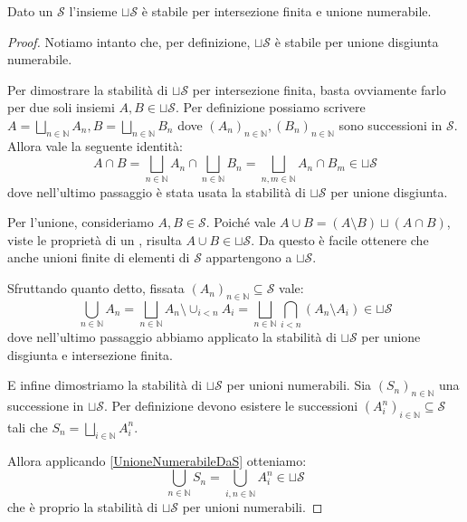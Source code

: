 \begin{proposition}\label{UnioneDisgiuntaQuasiAlgebra}
	Dato un \semiring{} $\mathcal S$ l'insieme $\sqcup\mathcal S$ è stabile per intersezione finita e unione numerabile.
\end{proposition}
\begin{proof}
	Notiamo intanto che, per definizione, $\sqcup\mathcal S$ è stabile per unione disgiunta numerabile.
	
	Per dimostrare la stabilità di $\sqcup\mathcal S$ per intersezione finita, basta ovviamente farlo per due soli insiemi $A,B\in\sqcup\mathcal S$. Per definizione possiamo scrivere $A=\bigsqcup_{n\in\mathbb N} A_n, B=\bigsqcup_{n\in\mathbb N} B_n$ dove $(A_n)_{n\in\mathbb N},(B_n)_{n\in\mathbb N}$ sono successioni in $\mathcal S$. Allora vale la seguente identità:
	\begin{equation*}
		A\cap B=\bigsqcup_{n\in\mathbb N} A_n\cap\bigsqcup_{n\in\mathbb N} B_n=
		\bigsqcup_{n,m\in\mathbb N} A_n\cap B_m\in\sqcup\mathcal S
	\end{equation*}
	dove nell'ultimo passaggio è stata usata la stabilità di $\sqcup\mathcal S$ per unione disgiunta.
	
	Per l'unione, consideriamo $A,B\in\mathcal S$. Poiché vale $A\cup B=(A\setminus B)\sqcup(A\cap B)$, viste le proprietà di un \semiring{}, risulta $A\cup B\in \sqcup\mathcal S$. Da questo è facile ottenere che anche unioni finite di elementi di $\mathcal S$ appartengono a $\sqcup\mathcal S$.
	
	Sfruttando quanto detto, fissata $(A_n)_{n\in\mathbb N}\subseteq\mathcal S$ vale:
	\begin{equation}\label{UnioneNumerabileDaS}
		\bigcup_{n\in\mathbb N} A_n=\bigsqcup_{n\in\mathbb N} A_n\setminus\cup_{i<n} A_i
		=\bigsqcup_{n\in\mathbb N} \bigcap_{i<n} (A_n\setminus A_i)\in\sqcup\mathcal S
	\end{equation}
	dove nell'ultimo passaggio abbiamo applicato la stabilità di $\sqcup\mathcal S$ per unione disgiunta e intersezione finita.
	
	E infine dimostriamo la stabilità di $\sqcup\mathcal S$ per unioni numerabili. Sia $(S_n)_{n\in\mathbb N}$ una successione in $\sqcup\mathcal S$. Per definizione devono esistere le successioni $(A^n_i)_{i\in\mathbb N}\subseteq \mathcal S$ tali che $S_n=\bigsqcup_{i\in\mathbb N} A^n_i$.
	
	Allora applicando \cref{UnioneNumerabileDaS} otteniamo:
	\begin{equation*}
		\bigcup_{n\in\mathbb N}S_n=\bigcup_{i,n\in\mathbb N}A^n_i\in\sqcup\mathcal S 
	\end{equation*}
	che è proprio la stabilità di $\sqcup\mathcal S$ per unioni numerabili.
\end{proof}

